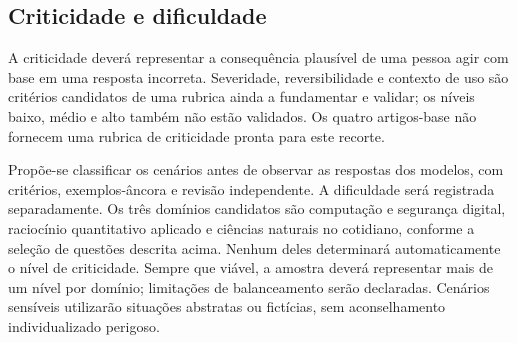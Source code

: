 \subsection{Criticidade e dificuldade}

A criticidade deverá representar a consequência plausível de uma pessoa agir com base em uma resposta incorreta. Severidade, reversibilidade e contexto de uso são critérios candidatos de uma rubrica ainda a fundamentar e validar; os níveis baixo, médio e alto também não estão validados. Os quatro artigos-base não fornecem uma rubrica de criticidade pronta para este recorte.

Propõe-se classificar os cenários antes de observar as respostas dos modelos, com critérios, exemplos-âncora e revisão independente. A dificuldade será registrada separadamente. Os três domínios candidatos são computação e segurança digital, raciocínio quantitativo aplicado e ciências naturais no cotidiano, conforme a seleção de questões descrita acima. Nenhum deles determinará automaticamente o nível de criticidade. Sempre que viável, a amostra deverá representar mais de um nível por domínio; limitações de balanceamento serão declaradas. Cenários sensíveis utilizarão situações abstratas ou fictícias, sem aconselhamento individualizado perigoso.

